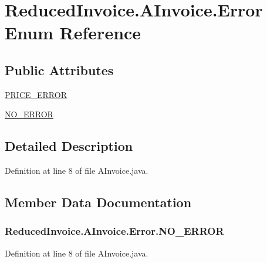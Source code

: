 \hypertarget{enum_reduced_invoice_1_1_a_invoice_1_1_error}{}\section{Reduced\+Invoice.\+A\+Invoice.\+Error Enum Reference}
\label{enum_reduced_invoice_1_1_a_invoice_1_1_error}
\subsection*{Public Attributes}
\begin{DoxyCompactItemize}
\item 
\hyperlink{enum_reduced_invoice_1_1_a_invoice_1_1_error_a5c521b3b1cc9827b5dba56d42a770481}{P\+R\+I\+C\+E\+\_\+\+E\+R\+R\+OR}
\item 
\hyperlink{enum_reduced_invoice_1_1_a_invoice_1_1_error_ab758351b18ce3163abca9924287fc6df}{N\+O\+\_\+\+E\+R\+R\+OR}
\end{DoxyCompactItemize}


\subsection{Detailed Description}


Definition at line 8 of file A\+Invoice.\+java.



\subsection{Member Data Documentation}
\subsubsection[{\texorpdfstring{N\+O\+\_\+\+E\+R\+R\+OR}{NO_ERROR}}]{\setlength{\rightskip}{0pt plus 5cm}Reduced\+Invoice.\+A\+Invoice.\+Error.\+N\+O\+\_\+\+E\+R\+R\+OR}\hypertarget{enum_reduced_invoice_1_1_a_invoice_1_1_error_ab758351b18ce3163abca9924287fc6df}{}\label{enum_reduced_invoice_1_1_a_invoice_1_1_error_ab758351b18ce3163abca9924287fc6df}


Definition at line 8 of file A\+Invoice.\+java.

